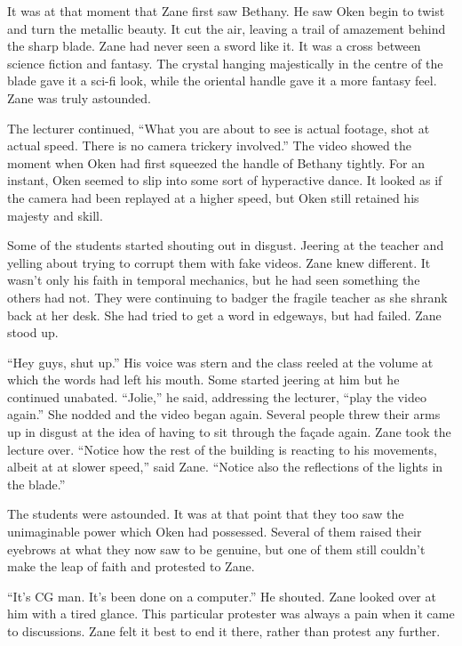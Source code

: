 It was at that moment that Zane first saw Bethany.  He saw Oken begin to twist and turn the metallic beauty.  It cut the air, leaving a trail of amazement behind the sharp blade.  Zane had never seen a sword like it.  It was a cross between science fiction and fantasy.  The crystal hanging majestically in the centre of the blade gave it a sci-fi look, while the oriental handle gave it a more fantasy feel.  Zane was truly astounded.

The lecturer continued, ``What you are about to see is actual footage, shot at actual speed.  There is no camera trickery involved.''  The video showed the moment when Oken had first squeezed the handle of Bethany tightly.  For an instant, Oken seemed to slip into some sort of hyperactive dance.  It looked as if the camera had been replayed at a higher speed, but Oken still retained his majesty and skill.

Some of the students started shouting out in disgust.  Jeering at the teacher and yelling about trying to corrupt them with fake videos.  Zane knew different.  It wasn't only his faith in temporal mechanics, but he had seen something the others had not.  They were continuing to badger the fragile teacher as she shrank back at her desk.  She had tried to get a word in edgeways, but had failed.  Zane stood up.

``Hey guys, shut up.''  His voice was stern and the class reeled at the volume at which the words had left his mouth.  Some started jeering at him but he continued unabated.  ``Jolie,'' he said, addressing the lecturer, ``play the video again.''  She nodded and the video began again.  Several people threw their arms up in disgust at the idea of having to sit through the façade again.  Zane took the lecture over.  ``Notice how the rest of the building is reacting to his movements, albeit at at slower speed,'' said Zane.  ``Notice also the reflections of the lights in the blade.''  

The students were astounded.  It was at that point that they too saw the unimaginable power which Oken had possessed.  Several of them raised their eyebrows at what they now saw to be genuine, but one of them still couldn't make the leap of faith and protested to Zane.

``It's CG man.  It's been done on a computer.''  He shouted.  Zane looked over at him with a tired glance.  This particular protester was always a pain when it came to discussions.  Zane felt it best to end it there, rather than protest any further.

